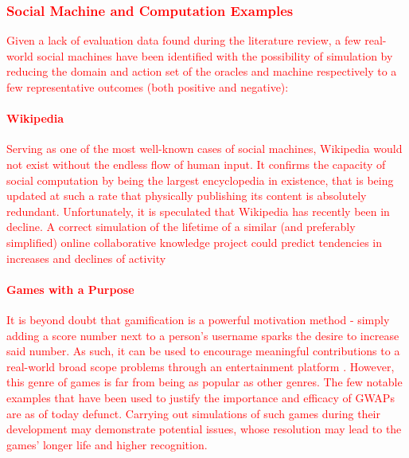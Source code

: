 \documentclass[12pt,a4,xcolor=table]{article}
\begin{document}
\textcolor{red}{
	\subsubsection{Social Machine and Computation Examples}
	Given a lack of evaluation data found during the literature review, a few real-world social machines have been identified with the possibility of simulation by reducing the domain and action set of the oracles and machine respectively to a few representative outcomes (both positive and negative):
	\paragraph{Wikipedia}
	Serving as one of the most well-known cases of social machines, Wikipedia would not exist without the endless flow of human input. It confirms the capacity of social computation by being the largest encyclopedia in existence, that is being updated at such a rate that physically publishing its content is absolutely redundant. Unfortunately, it is speculated that Wikipedia has recently been in decline\cite{simonite2013decline}. A correct simulation of the lifetime of a similar (and preferably simplified) online collaborative knowledge project could predict tendencies in increases and declines of activity
	\paragraph{Games with a Purpose}
	It is beyond doubt that gamification is a powerful motivation method - simply adding a score number next to a person's username sparks the desire to increase said number. As such, it can be used to encourage meaningful contributions to a real-world broad scope problems through an entertainment platform \cite{Ahn2006}. However, this genre of games is far from being as popular as other genres. The few notable examples that have been used to justify the importance and efficacy of GWAPs\cite{von2008designing} are as of today defunct. Carrying out simulations of such games during their development may demonstrate potential issues, whose resolution may lead to the games' longer life and higher recognition.	
}
\end{document}
